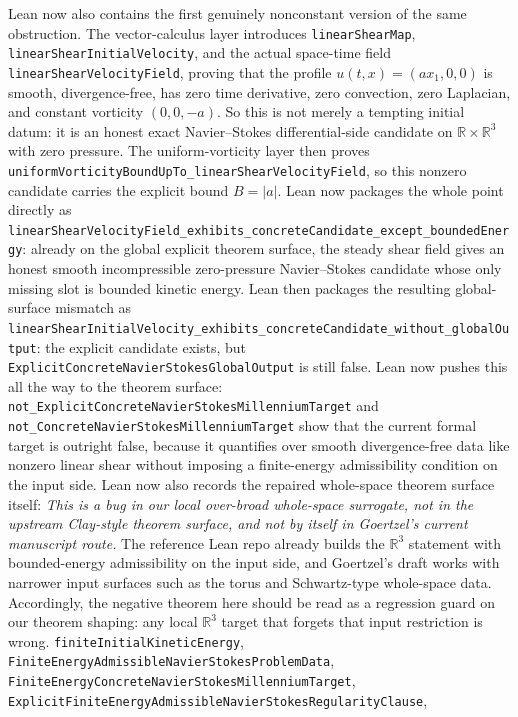 \documentclass[11pt]{article}
\begin{document}
Lean now also contains the first genuinely nonconstant version of the same
obstruction.  The vector-calculus layer introduces
\texttt{linearShearMap}, \texttt{linearShearInitialVelocity}, and the actual
space-time field \texttt{linearShearVelocityField}, proving that the profile
\(u(t,x) = (a x_1, 0, 0)\) is smooth, divergence-free, has zero time
derivative, zero convection, zero Laplacian, and constant vorticity
\((0,0,-a)\).  So this is not merely a tempting initial datum: it is an honest
exact Navier--Stokes differential-side candidate on
\(\mathbb{R} \times \mathbb{R}^3\) with zero pressure.  The uniform-vorticity
layer then proves \texttt{uniformVorticityBoundUpTo\_linearShearVelocityField},
so this nonzero candidate carries the explicit bound \(B = |a|\).  Lean now
packages the whole point directly as
\texttt{linearShearVelocityField\_exhibits\_concreteCandidate\_except\_boundedEnergy}:
already on the global explicit theorem surface, the steady shear field gives an
honest smooth incompressible zero-pressure Navier--Stokes candidate whose only
missing slot is bounded kinetic energy.  Lean then packages the resulting
global-surface mismatch as
\texttt{linearShearInitialVelocity\_exhibits\_concreteCandidate\_without\_globalOutput}:
the explicit candidate exists, but \texttt{ExplicitConcreteNavierStokesGlobalOutput}
is still false.  Lean now pushes this all the way to the theorem surface:
\texttt{not\_ExplicitConcreteNavierStokesMillenniumTarget} and
\texttt{not\_ConcreteNavierStokesMillenniumTarget} show that the current
formal target is outright false, because it quantifies over smooth
divergence-free data like nonzero linear shear without imposing a finite-energy
admissibility condition on the input side.  Lean now also records the repaired
whole-space theorem surface itself:
\emph{This is a bug in our local over-broad whole-space surrogate, not in the
upstream Clay-style theorem surface, and not by itself in Goertzel's current
manuscript route.}  The reference Lean repo already builds the
\(\mathbb{R}^3\) statement with bounded-energy admissibility on the input side,
and Goertzel's draft works with narrower input surfaces such as the torus and
Schwartz-type whole-space data.  Accordingly, the negative theorem here should
be read as a regression guard on our theorem shaping: any local
\(\mathbb{R}^3\) target that forgets that input restriction is wrong.
\texttt{finiteInitialKineticEnergy},
\texttt{FiniteEnergyAdmissibleNavierStokesProblemData},
\texttt{FiniteEnergyConcreteNavierStokesMillenniumTarget},
\texttt{ExplicitFiniteEnergyAdmissibleNavierStokesRegularityClause},
\end{document}
